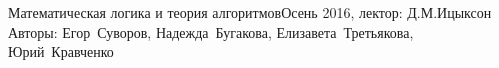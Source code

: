 

\newcommand{\No}{\mathcal{N}}


\BigHeader
	{Математическая логика и теория алгоритмов}{Осень 2016, лектор: Д.М.Ицыксон}
	{Авторы: Егор~Суворов, Надежда~Бугакова, Елизавета~Третьякова, Юрий~Кравченко}

	
	
	
	
	
	
	


